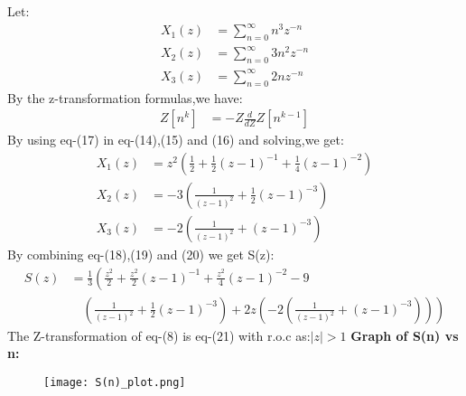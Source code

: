 \documentclass[journal,12pt,twocolumn]{IEEEtran}
\theoremstyle{remark}
\begin{document}
Let:
\begin{align}
    X_1(z)&=\sum_{n=0}^{\infty}n^3 z^{-n}\\ X_2(z)&=\sum_{n=0}^{\infty}3n^2z^{-n}\\ X_3(z)&=\sum_{n=0}^{\infty}2nz^{-n}
\end{align}
By the z-transformation formulas,we have:
\begin{align}
     Z[n^k]&=-Z\frac{d}{dZ}Z[n^{k-1}]
\end{align}
By using eq-(17) in eq-(14),(15) and (16) and solving,we get:
\begin{align}
    X_1(z) &= z^2 \left( \frac{1}{2} + \frac{1}{2}(z - 1)^{-1} + \frac{1}{4}(z - 1)^{-2} \right)\\
    X_2(z) &= -3 \left( \frac{1}{(z - 1)^2} + \frac{1}{2}(z - 1)^{-3} \right) \\
    X_3(z) &= -2 \left( \frac{1}{(z - 1)^2} + (z - 1)^{-3} \right)
\end{align}
By combining eq-(18),(19) and (20) we get S(z):
\begin{align}
S(z) &= \frac{1}{3} \left( \frac{z^2}{2} + \frac{z^2}{2}(z - 1)^{-1} + \frac{z^2}{4}(z - 1)^{-2}  - 9 \right. \nonumber \\
&\quad\left( \frac{1}{(z - 1)^2} + \frac{1}{2}(z - 1)^{-3} \right) + 2z \left. \left( -2 \left( \frac{1}{(z - 1)^2} + (z - 1)^{-3} \right) \right) \right)
\end{align}
The Z-transformation of eq-(8) is eq-(21) with r.o.c as:$|z|>1$
\newpage
\textbf{Graph of S(n) vs n:}
\begin{figure}[h]
        \centering
\texttt{[image: S(n)\_plot.png]}
    \end{figure}
\end{document}
